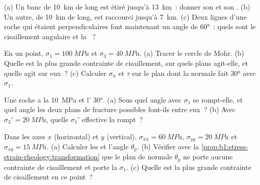 \begin{exercise}[$\star$]\label{exo:b1:stress-strain-rheology:2}
(a) Un banc de \qty{10}{km} de long est étiré jusqu'à \qty{13}{km}~: donner son 
et son . (b) Un autre, de \qty{10}{km} de long, est raccourci jusqu'à \qty{7}{km}.
(c) Deux lignes d'une roche qui étaient perpendiculaires font maintenant un angle de
\ang{60}~: quels sont le cisaillement angulaire et la ~?
\end{exercise}

\begin{exercise}[$\star$]\label{exo:b1:stress-strain-rheology:3}
En un point, $\sigma_1 = \qty{100}{MPa}$ et $\sigma_3 = \qty{40}{MPa}$.
(a) Tracer le cercle de Mohr. (b) Quelle est la plus grande contrainte de cisaillement, sur quels
plans agit-elle, et quelle  agit sur eux~? (c) Calculer $\sigma_n$
et $\tau$ sur le plan dont la normale fait \ang{30} avec $\sigma_1$.
\end{exercise}

\begin{exercise}[$\star$]\label{exo:b1:stress-strain-rheology:4}
Une roche a la  \qty{10}{MPa} et l'
\ang{30}. (a) Sous quel angle avec $\sigma_1$ se rompt-elle, et quel angle les
deux plans de fracture possibles font-ils entre eux~? (b) Avec
$\sigma_3' = \qty{20}{MPa}$, quelle $\sigma_1'$ effective la rompt~?
\end{exercise}

\begin{exercise}[$\star\star$]\label{exo:b1:stress-strain-rheology:5}
Dans les axes $x$ (horizontal) et $y$ (vertical), $\sigma_{xx} = \qty{60}{MPa}$,
$\sigma_{yy} = \qty{20}{MPa}$ et $\sigma_{xy} = \qty{15}{MPa}$. (a) Calculer les
 et l'angle $\theta_p$. (b) Vérifier avec la
\cref{prop:b1:stress-strain-rheology:transformation} que le plan de normale
$\theta_p$ ne porte aucune contrainte de cisaillement et porte la  $\sigma_1$. (c) Quelle est
la plus grande contrainte de cisaillement en ce point~?
\end{exercise}

